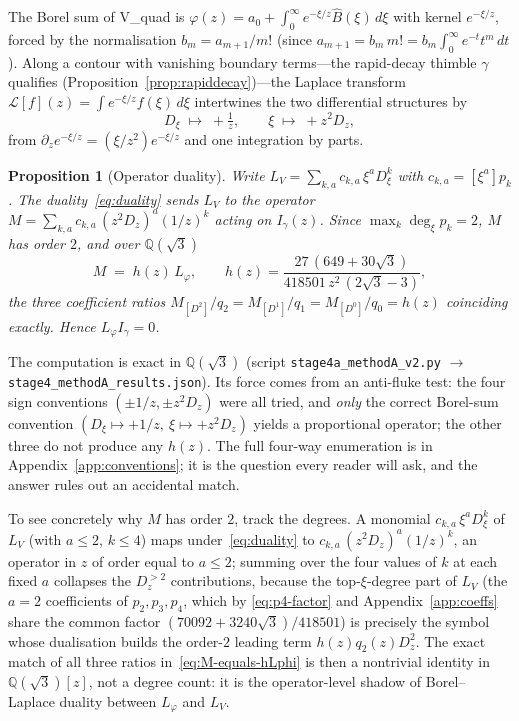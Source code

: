 \documentclass[11pt,reqno]{amsart}
\theoremstyle{plain}
\newtheorem{proposition}[theorem]{Proposition}
\theoremstyle{definition}
\newcommand{\Bhat}{\widehat{B}}
\newcommand{\Lphi}{L_{\varphi}}
\newcommand{\LV}{L_{V}}
\newcommand{\Qsqrt}{\mathbb{Q}(\sqrt3)}
\begin{document}
The Borel sum of V\_quad is $\varphi(z)=a_0+\int_0^\infty e^{-\xi/z}\Bhat(\xi)\,d\xi$ with kernel
$e^{-\xi/z}$, forced by the normalisation $b_m=a_{m+1}/m!$ (since
$a_{m+1}=b_m\,m!=b_m\int_0^\infty e^{-t}t^m\,dt$). Along a contour with vanishing boundary
terms---the rapid-decay thimble $\gamma$ qualifies (Proposition~\ref{prop:rapiddecay})---the
Laplace transform $\mathcal{L}[f](z)=\int e^{-\xi/z}f(\xi)\,d\xi$ intertwines the two differential
structures by
\begin{equation}\label{eq:duality}
  D_\xi\;\longmapsto\;+\tfrac1z,\qquad \xi\;\longmapsto\;+z^2 D_z,
\end{equation}
from $\partial_z e^{-\xi/z}=(\xi/z^2)e^{-\xi/z}$ and one integration by parts.

\begin{proposition}[Operator duality]\label{prop:methodA}
Write $\LV=\sum_{k,a}c_{k,a}\,\xi^a D_\xi^k$ with $c_{k,a}=[\xi^a]p_k$. The
duality~\eqref{eq:duality} sends $\LV$ to the operator
$M=\sum_{k,a}c_{k,a}\,(z^2D_z)^a(1/z)^k$ acting on $I_\gamma(z)$. Since $\max_k\deg_\xi p_k=2$,
$M$ has order $2$, and over $\Qsqrt$
\begin{equation}\label{eq:M-equals-hLphi}
  M\;=\;h(z)\,\Lphi,\qquad h(z)=\frac{27\,(649+30\sqrt3)}{418501\,z^2\,(2\sqrt3-3)} ,
\end{equation}
the three coefficient ratios $M_{[D^2]}/q_2=M_{[D^1]}/q_1=M_{[D^0]}/q_0=h(z)$ coinciding exactly.
Hence $\Lphi I_\gamma=0$.
\end{proposition}

The computation is exact in $\Qsqrt$ (script \texttt{stage4a\_methodA\_v2.py}
$\to$ \texttt{stage4\_methodA\_results.json}). Its force comes from an anti-fluke test: the four
sign conventions $(\pm1/z,\pm z^2D_z)$ were all tried, and \emph{only} the correct Borel-sum
convention $(D_\xi\mapsto+1/z,\ \xi\mapsto+z^2D_z)$ yields a proportional operator; the other three
do not produce any $h(z)$. The full four-way enumeration is in Appendix~\ref{app:conventions};
it is the question every reader will ask, and the answer rules out an accidental match.

To see concretely why $M$ has order $2$, track the degrees. A monomial $c_{k,a}\,\xi^a D_\xi^k$ of
$\LV$ (with $a\le2$, $k\le4$) maps under~\eqref{eq:duality} to
$c_{k,a}\,(z^2D_z)^a(1/z)^k$, an operator in $z$ of order equal to $a\le2$; summing over the four
values of $k$ at each fixed $a$ collapses the $D_z^{>2}$ contributions, because the
top-$\xi$-degree part of $\LV$ (the $a=2$ coefficients of $p_2,p_3,p_4$, which by
\eqref{eq:p4-factor} and Appendix~\ref{app:coeffs} share the common factor
$(70092+3240\sqrt3)/418501$) is precisely the symbol whose dualisation builds the order-$2$ leading
term $h(z)q_2(z)D_z^2$. The exact match of all three ratios in~\eqref{eq:M-equals-hLphi} is then a
nontrivial identity in $\Qsqrt[z]$, not a degree count: it is the operator-level shadow of
Borel--Laplace duality between $\Lphi$ and $\LV$.
\end{document}
